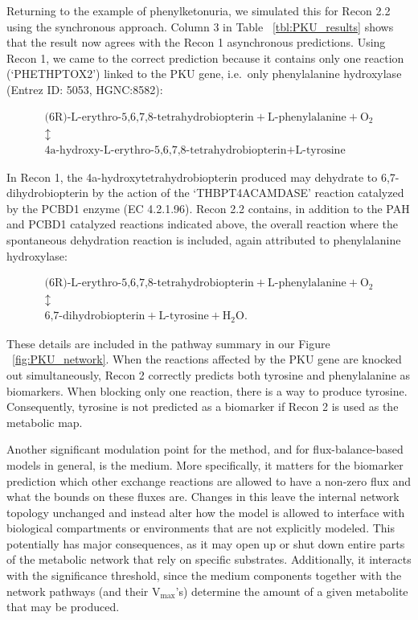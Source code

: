 \documentclass[10pt,a4paper,onecolumn]{article}
\begin{document}
Returning to the example of phenylketonuria, we simulated this for Recon
2.2 using the synchronous approach. Column 3 in Table
~\ref{tbl:PKU_results} shows that the result now agrees with the Recon 1
asynchronous predictions. Using Recon 1, we came to the correct
prediction because it contains only one reaction (`PHETHPTOX2') linked
to the PKU gene, i.e.~only phenylalanine hydroxylase (Entrez ID: 5053,
HGNC:8582):

\begin{gather*}
\text{(6R)-L-erythro-5,6,7,8-tetrahydrobiopterin} + \text{L-phenylalanine} + \text{O}_2 \\
\updownarrow \\
\text{4a-hydroxy-L-erythro-5,6,7,8-tetrahydrobiopterin} + \text{L-tyrosine}
\end{gather*}

In Recon 1, the 4a-hydroxytetrahydrobiopterin produced may dehydrate to
6,7-dihydrobiopterin by the action of the `THBPT4ACAMDASE' reaction
catalyzed by the PCBD1 enzyme (EC 4.2.1.96). Recon 2.2 contains, in
addition to the PAH and PCBD1 catalyzed reactions indicated above, the
overall reaction where the spontaneous dehydration reaction is included,
again attributed to phenylalanine hydroxylase:

\begin{gather*}
\text{(6R)-L-erythro-5,6,7,8-tetrahydrobiopterin} + \text{L-phenylalanine} + \text{O}_2 \\
 \updownarrow \\
\text{6,7-dihydrobiopterin} + \text{L-tyrosine} + \text{H}_2\text{O}.
\end{gather*}

These details are included in the pathway summary in our Figure
~\ref{fig:PKU_network}. When the reactions affected by the PKU gene are
knocked out simultaneously, Recon 2 correctly predicts both tyrosine and
phenylalanine as biomarkers. When blocking only one reaction, there is a
way to produce tyrosine. Consequently, tyrosine is not predicted as a
biomarker if Recon 2 is used as the metabolic map.

Another significant modulation point for the method, and for
flux-balance-based models in general, is the medium. More specifically,
it matters for the biomarker prediction which other exchange reactions
are allowed to have a non-zero flux and what the bounds on these fluxes
are. Changes in this leave the internal network topology unchanged and
instead alter how the model is allowed to interface with biological
compartments or environments that are not explicitly modeled. This
potentially has major consequences, as it may open up or shut down
entire parts of the metabolic network that rely on specific substrates.
Additionally, it interacts with the significance threshold, since the
medium components together with the network pathways (and their
V\(_{\text{max}}\)'s) determine the amount of a given metabolite that
may be produced.
\end{document}
